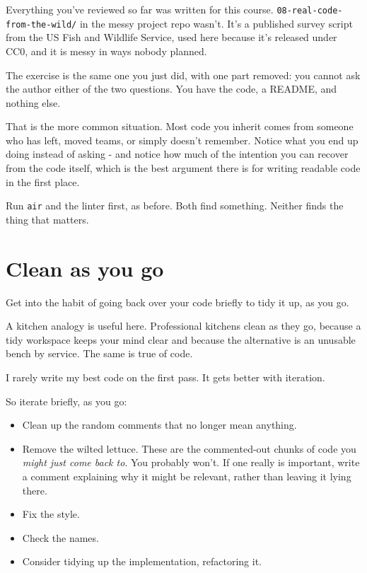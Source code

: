 \documentclass[
  letterpaper,
  justified,
  a4paper]{tufte-book}
\providecommand{\tightlist}{%
  \setlength{\itemsep}{0pt}\setlength{\parskip}{0pt}}
\providecommand{\tightlist}{%
  \setlength{\itemsep}{0pt}\setlength{\parskip}{0pt}}
\begin{document}
\begin{tcolorbox}[enhanced jigsaw, arc=.35mm, bottomrule=.15mm, bottomtitle=1mm, breakable, colback=white, colbacktitle=quarto-callout-tip-color!10!white, colframe=quarto-callout-tip-color-frame, coltitle=black, left=2mm, leftrule=.75mm, opacityback=0, opacitybacktitle=0.6, rightrule=.15mm, title=\textcolor{quarto-callout-tip-color}{\faLightbulb}\hspace{0.5em}{If you want a harder one: real code, real stranger}, titlerule=0mm, toprule=.15mm, toptitle=1mm]

Everything you've reviewed so far was written for this course.
\texttt{08-real-code-from-the-wild/} in the messy project repo wasn't.
It's a published survey script from the US Fish and Wildlife Service,
used here because it's released under CC0, and it is messy in ways
nobody planned.

The exercise is the same one you just did, with one part removed: you
cannot ask the author either of the two questions. You have the code, a
README, and nothing else.

That is the more common situation. Most code you inherit comes from
someone who has left, moved teams, or simply doesn't remember. Notice
what you end up doing instead of asking - and notice how much of the
intention you can recover from the code itself, which is the best
argument there is for writing readable code in the first place.

Run \texttt{air} and the linter first, as before. Both find something.
Neither finds the thing that matters.

\end{tcolorbox}

\section{Clean as you go}\label{clean-as-you-go}

Get into the habit of going back over your code briefly to tidy it up,
as you go.

A kitchen analogy is useful here. Professional kitchens clean as they
go, because a tidy workspace keeps your mind clear and because the
alternative is an unusable bench by service. The same is true of code.

I rarely write my best code on the first pass. It gets better with
iteration.

So iterate briefly, as you go:

\begin{itemize}
\tightlist
\item
  Clean up the random comments that no longer mean anything.
\item
  Remove the wilted lettuce. These are the commented-out chunks of code
  you \emph{might just come back to}. You probably won't. If one really
  is important, write a comment explaining why it might be relevant,
  rather than leaving it lying there.
\item
  Fix the style.
\item
  Check the names.
\item
  Consider tidying up the implementation, refactoring it.
\end{itemize}
\end{document}
